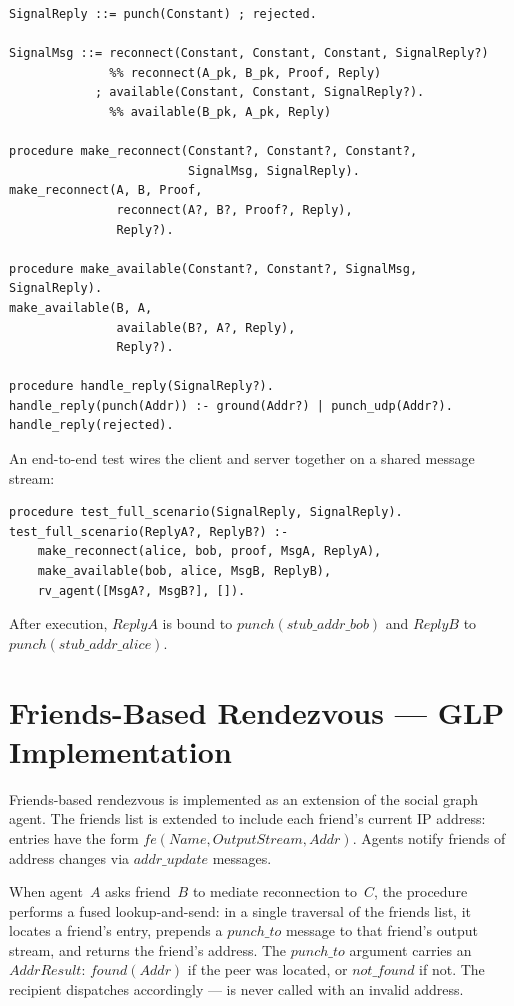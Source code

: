 \begin{verbatim}
SignalReply ::= punch(Constant) ; rejected.

SignalMsg ::= reconnect(Constant, Constant, Constant, SignalReply?)
              %% reconnect(A_pk, B_pk, Proof, Reply)
            ; available(Constant, Constant, SignalReply?).
              %% available(B_pk, A_pk, Reply)

procedure make_reconnect(Constant?, Constant?, Constant?,
                         SignalMsg, SignalReply).
make_reconnect(A, B, Proof,
               reconnect(A?, B?, Proof?, Reply),
               Reply?).

procedure make_available(Constant?, Constant?, SignalMsg, SignalReply).
make_available(B, A,
               available(B?, A?, Reply),
               Reply?).

procedure handle_reply(SignalReply?).
handle_reply(punch(Addr)) :- ground(Addr?) | punch_udp(Addr?).
handle_reply(rejected).
\end{verbatim}

An end-to-end test wires the client and server together on a shared message stream:
\begin{verbatim}
procedure test_full_scenario(SignalReply, SignalReply).
test_full_scenario(ReplyA?, ReplyB?) :-
    make_reconnect(alice, bob, proof, MsgA, ReplyA),
    make_available(bob, alice, MsgB, ReplyB),
    rv_agent([MsgA?, MsgB?], []).
\end{verbatim}
After execution, $\mathit{ReplyA}$ is bound to $\mathit{punch}(\mathit{stub\_addr\_bob})$ and $\mathit{ReplyB}$ to $\mathit{punch}(\mathit{stub\_addr\_alice})$.

\section{Friends-Based Rendezvous --- GLP Implementation}
\label{appendix:fmrv}
Friends-based rendezvous is implemented as an extension of the social graph agent.  The friends list is extended to include each friend's current IP address: entries have the form $\mathit{fe}(\mathit{Name}, \mathit{OutputStream}, \mathit{Addr})$.  Agents notify friends of address changes via $\mathit{addr\_update}$ messages.

When agent~$A$ asks friend~$B$ to mediate reconnection to~$C$, the procedure  performs a fused lookup-and-send: in a single traversal of the friends list, it locates a friend's entry, prepends a $\mathit{punch\_to}$ message to that friend's output stream, and returns the friend's address.  The $\mathit{punch\_to}$ argument carries an $\mathit{AddrResult}$: $\mathit{found}(\mathit{Addr})$ if the peer was located, or $\mathit{not\_found}$ if not.  The recipient dispatches accordingly ---  is never called with an invalid address.

